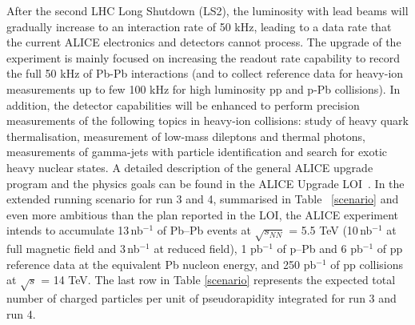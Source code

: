 After the second LHC Long Shutdown (LS2), the luminosity with lead beams will gradually increase to an interaction rate of 50 kHz, %
leading to a data rate that the current ALICE electronics and detectors cannot process. The upgrade of the experiment is mainly focused on increasing the readout rate capability to record the full 50 kHz of Pb-Pb interactions (and to collect reference data for heavy-ion measurements up to few 100 kHz for high luminosity pp and p-Pb collisions). In addition, the detector capabilities will be enhanced to perform precision measurements of the following topics in heavy-ion collisions: study of heavy quark thermalisation, measurement of low-mass dileptons and thermal photons, measurements of gamma-jets with particle identification and search for exotic heavy nuclear states. A detailed description of the general ALICE upgrade program and the physics goals can be found in the ALICE Upgrade LOI~\cite{upgrade}. In the extended running scenario for {\sc run} 3 and 4, summarised in Table ~\ref{scenario} and even more ambitious than the plan reported in the LOI, the ALICE experiment intends to accumulate 13\,nb$^{-1}$ of Pb--Pb events at $\sqrt{s_{NN}}$ = 5.5 TeV (10\,nb$^{-1}$ at full magnetic field and 3\,nb$^{-1}$ at reduced field), 1 pb$^{-1}$ of p--Pb and 6 pb$^{-1}$ of pp reference data at the equivalent Pb nucleon energy, and 250 pb$^{-1}$ of pp collisions at $\sqrt{s}$ = 14 TeV. The last row in Table \ref{scenario} represents the expected total number of charged particles per unit of pseudorapidity integrated for {\sc run} 3 and {\sc run} 4. 


